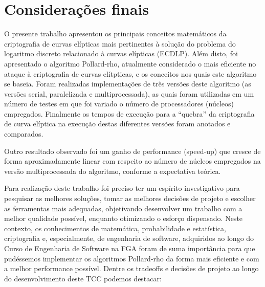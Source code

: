 \chapter{Considerações finais}
O presente trabalho apresentou os principais conceitos matemáticos da criptografia de curvas elípticas mais pertinentes à solução do problema do logaritmo discreto relacionado à curvas elípticas (ECDLP). Além disto, foi apresentado o algoritmo Pollard-rho, atualmente considerado o mais eficiente no ataque à criptografia de curvas elítpticas, e os conceitos nos quais este algoritmo se baseia. Foram realizadas implementações de três versões deste algoritmo (as versões serial, paralelizada e multiprocessada), as quais foram utilizadas em um número de testes em que foi variado o número de processadores (núcleos) empregados. Finalmente os tempos de execução para a ``quebra'' da criptografia de curva elíptica na execução destas diferentes versões foram anotados e comparados.


Outro resultado observado foi um ganho de performance (speed-up) que cresce de forma aproximadamente linear com respeito ao número de núcleos empregados na versão multiprocessada do algoritmo, conforme a expectativa teórica.

Para realização deste trabalho foi preciso ter um espírito investigativo para pesquisar as melhores soluções, tomar as melhores decisões de projeto e escolher as ferramentas mais adequadas, objetivando desenvolver um trabalho com a melhor qualidade possível, enquanto otimizando o esforço dispensado. Neste contexto, os conhecimentos de matemática, probabilidade e estatística, criptografia e, especialmente, de engenharia de software, adquiridos ao longo do Curso de Engenharia de Software na FGA foram de suma importância para que pudéssemos implementar os algoritmos Pollard-rho da forma mais eficiente e com a melhor performance possível. Dentre os tradeoffs e decisões de projeto ao longo do desenvolvimento deste TCC podemos destacar:

